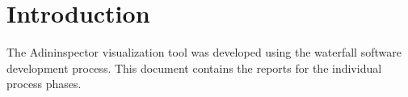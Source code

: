 \chapter{Introduction}\label{sec:main_introduction}
The Adininspector visualization tool was developed using the waterfall software development process.
This document contains the reports for the individual process phases.
